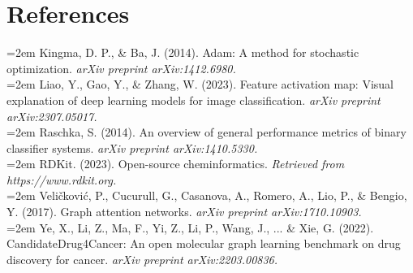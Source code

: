 \documentclass[fontsize=11pt]{article}
\begin{document}
\section*{References}

\noindent
\hangindent=2em
Kingma, D. P., \& Ba, J. (2014). Adam: A method for stochastic optimization. \textit{arXiv preprint arXiv:1412.6980.}
\\

\noindent
\hangindent=2em
Liao, Y., Gao, Y., \& Zhang, W. (2023). Feature activation map: Visual explanation of deep learning models for image classification. \textit{arXiv preprint arXiv:2307.05017.}
\\

\noindent
\hangindent=2em
Raschka, S. (2014). An overview of general performance metrics of binary classifier systems. \textit{arXiv preprint arXiv:1410.5330.}
\\

\noindent
\hangindent=2em
RDKit. (2023). Open-source cheminformatics. \textit{Retrieved from https://www.rdkit.org.}
\\

\noindent
\hangindent=2em
Veličković, P., Cucurull, G., Casanova, A., Romero, A., Lio, P., \& Bengio, Y. (2017). Graph attention networks. \textit{arXiv preprint arXiv:1710.10903.}
\\

\noindent
\hangindent=2em
Ye, X., Li, Z., Ma, F., Yi, Z., Li, P., Wang, J., ... \& Xie, G. (2022). CandidateDrug4Cancer: An open molecular graph learning benchmark on drug discovery for cancer. \textit{arXiv preprint arXiv:2203.00836.}

\end{document}
